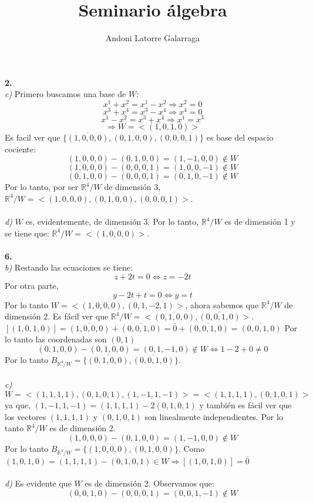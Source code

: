 \documentclass{article}
\title{Seminario álgebra}
\author{Andoni Latorre Galarraga}
\date{}
\begin{document}
\maketitle
\noindent \textbf{2.}\\
\textit{c)} Primero buscamos una base de $W$:
$$
x^1 + x^2 = x^1 - x^2 \Rightarrow x^2 = 0
$$
$$
x^3 + x^4 = x^3 - x^4 \Rightarrow x^4 = 0
$$
$$
x^1 - x^2 = x^3 + x^4 \Rightarrow x^1 = x^3
$$
$$
\Rightarrow W = <(1,0,1,0)>
$$
Es facil ver que $\{ \overline{(1,0,0,0)}, \overline{(0,1,0,0)}, \overline{(0,0,0,1)} \}$ es base del espacio cociente:
$$
(1,0,0,0)-(0,1,0,0)=(1,-1,0,0)\notin W
$$
$$
(1,0,0,0)-(0,0,0,1)=(1,0,0,-1)\notin W
$$
$$
(0,1,0,0)-(0,0,0,1)=(0,1,0,-1)\notin W
$$
Por lo tanto, por ser $\mathbb{R}^4/W$ de dimensión 3, $\mathbb{R}^4/W = < \overline{(1,0,0,0)}, \overline{(0,1,0,0)}, \overline{(0,0,0,1)} >$.
\\
\\
\textit{d)} $W$ es, evidentemente, de dimensión 3. Por lo tanto, $\mathbb{R}^4/W$ es de dimensión 1 y se tiene que: $\mathbb{R}^4/W = <\overline{(1,0,0,0)}>$.
\\\\
\textbf{6.}\\
\textit{b)} Restando las ecuaciones se tiene:
$$
z + 2t= 0 \Leftrightarrow  z = -2t
$$
Por otra parte,
$$
y -2t + t = 0 \Leftrightarrow y = t
$$
Por lo tanto $W=<(1,0,0,0),(0,1,-2,1)>$, ahora sabemos que $\mathbb{R}^4/W$ de dimensión 2. Es fácil ver que $\mathbb{R}^4/W = <\overline{(0,1,0,0)},\overline{(0,0,1,0)}>$. $[(1,0,1,0)]= \overline{(1,0,0,0)}+\overline{(0,0,1,0)}= \bar{0} + \overline{(0,0,1,0)} = \overline{(0,0,1,0)}$ Por lo tanto las coordenadas son $(0,1)$
$$
(0,1,0,0)-(0,1,0,0)=(0,1,-1,0)\notin W \Leftrightarrow 1-2+0\ne0
$$
Por lo tanto $B_{\mathbb{R}^4/W} = \{ \overline{(0,1,0,0)}, \overline{(0,0,1,0)} \}$.\\\\
\textit{c)} $W = <(1,1,1,1), (0,1,0,1), (1,-1,1,-1)> = <(1,1,1,1), (0,1,0,1)>$ ya que, $(1,-1,1,-1) = (1,1,1,1) - 2(0,1,0,1)$ y también es fácil ver que los vectores $(1,1,1,1)$ y $(0,1,0,1)$ son linealmente independientes. Por lo tanto $\mathbb{R}^4/W$ es de dimensión 2.
$$
(1,0,0,0)-(0,1,0,0)=(1,-1,0,0)\notin W
$$
Por lo tanto $B_{\mathbb{R}^4/W} = \{ \overline{(1,0,0,0)}, \overline{(0,1,0,0)} \}$. Como $(1,0,1,0) = (1,1,1,1)-(0,1,0,1)\in W \Rightarrow [(1,0,1,0)]=\bar{0}$\\\\
\textit{d)} Es evidente que $W$ es de dimensión 2. Observamos que:
$$
(0,0,1,0)-(0,0,0,1)=(0,0,1,-1)\notin W
$$
\end{document}
